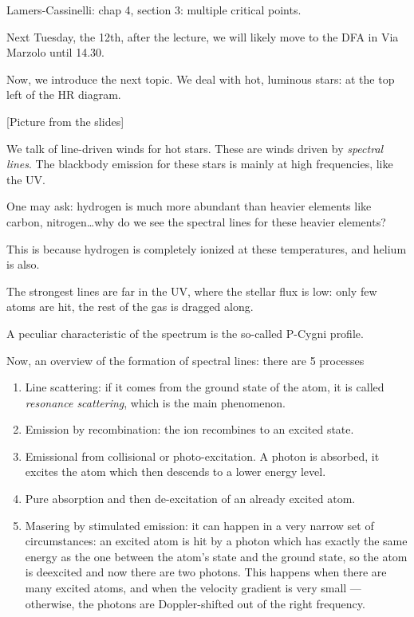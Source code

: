 \documentclass[main.tex]{subfiles}
\begin{document}
Lamers-Cassinelli: chap 4, section 3: multiple critical points.

Next Tuesday, the 12th, after the lecture, we will likely move to the DFA in Via Marzolo until 14.30.

Now, we introduce the next topic.
We deal with hot, luminous stars: at the top left of the HR diagram.

[Picture from the slides]

We talk of line-driven winds for hot stars.
These are winds driven by \emph{spectral lines}. 
The blackbody emission for these stars is mainly at high frequencies, like the UV.

One may ask: hydrogen is much more abundant than heavier elements like carbon, nitrogen\dots why do we see the spectral lines for these heavier elements?

This is because hydrogen is completely ionized at these temperatures, and helium is also.

The strongest lines are far in the UV, where the stellar flux is low: only few atoms are hit, the rest of the gas is dragged along.

A peculiar characteristic of the spectrum is the so-called P-Cygni profile.

Now, an overview of the formation of spectral lines:
there are 5 processes \begin{enumerate}
    \item Line scattering: if it comes from the ground state of the atom, it is called \emph{resonance scattering}, which is the main phenomenon.
    \item Emission by recombination: the ion recombines to an excited state.
    \item Emissional from collisional or photo-excitation. A photon is absorbed, it excites the atom which then descends to a lower energy level.
    \item Pure absorption and then de-excitation of an already excited atom.
    \item Masering by stimulated emission: it can happen in a very narrow set of circumstances: an excited atom is hit by a photon which has exactly the same energy as the one between the atom's state and the ground state, so the atom is deexcited and now there are two photons.
    This happens when there are many excited atoms, and when the velocity gradient is very small --- otherwise, the photons are Doppler-shifted out of the right frequency.
\end{enumerate}
\end{document}
